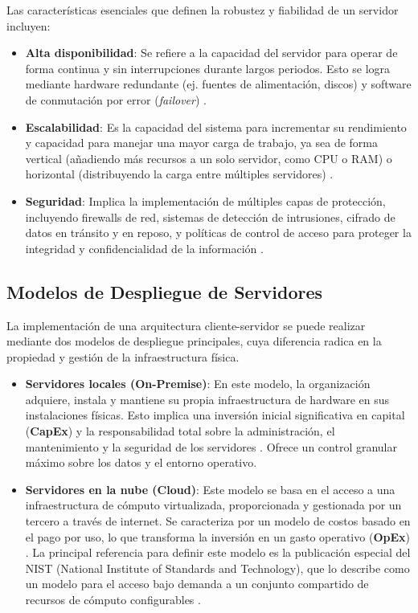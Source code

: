 Las características esenciales que definen la robustez y fiabilidad de un servidor incluyen:

\begin{itemize}
    \item \textbf{Alta disponibilidad}: Se refiere a la capacidad del servidor para operar de forma continua y sin interrupciones durante largos periodos. Esto se logra mediante hardware redundante (ej. fuentes de alimentación, discos) y software de conmutación por error (\textit{failover}) \cite{Stanek2014}.
    \item \textbf{Escalabilidad}: Es la capacidad del sistema para incrementar su rendimiento y capacidad para manejar una mayor carga de trabajo, ya sea de forma vertical (añadiendo más recursos a un solo servidor, como CPU o RAM) o horizontal (distribuyendo la carga entre múltiples servidores) \cite{Mancera2015}.
    \item \textbf{Seguridad}: Implica la implementación de múltiples capas de protección, incluyendo firewalls de red, sistemas de detección de intrusiones, cifrado de datos en tránsito y en reposo, y políticas de control de acceso para proteger la integridad y confidencialidad de la información \cite{Espana2003}.
\end{itemize}

\subsection{Modelos de Despliegue de Servidores}
\label{subsec:modelos_despliegue_marco}

La implementación de una arquitectura cliente-servidor se puede realizar mediante dos modelos de despliegue principales, cuya diferencia radica en la propiedad y gestión de la infraestructura física.

\begin{itemize}
    \item \textbf{Servidores locales (On-Premise)}: En este modelo, la organización adquiere, instala y mantiene su propia infraestructura de hardware en sus instalaciones físicas. Esto implica una inversión inicial significativa en capital (\textbf{CapEx}) y la responsabilidad total sobre la administración, el mantenimiento y la seguridad de los servidores \cite{Mullins2012}. Ofrece un control granular máximo sobre los datos y el entorno operativo.

    \item \textbf{Servidores en la nube (Cloud)}: Este modelo se basa en el acceso a una infraestructura de cómputo virtualizada, proporcionada y gestionada por un tercero a través de internet. Se caracteriza por un modelo de costos basado en el pago por uso, lo que transforma la inversión en un gasto operativo (\textbf{OpEx}) \cite{softteco2024}. La principal referencia para definir este modelo es la publicación especial del NIST (National Institute of Standards and Technology), que lo describe como un modelo para el acceso bajo demanda a un conjunto compartido de recursos de cómputo configurables \cite{mell2011nist}.
\end{itemize}

